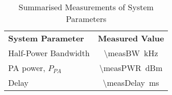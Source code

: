 \begin{table}[htbp]
  \centering
  \caption{Summarised Measurements of System Parameters}
    \begin{tabular}{lc}
    \rowcolor[rgb]{ 0,  0,  0} \textcolor[rgb]{ 1,  1,  1}{\textbf{System Parameter}}	& \textcolor[rgb]{ 1,  1,  1}{\textbf{Measured Value}} 		\\
    	Half-Power Bandwidth										& \SI{\measBW}{kHz}					\\
    	PA power, $P_{PA}$ 											& \SI{\measPWR}{dBm}					\\
    	Delay 													& \SI{\measDelay}{ms} 					\\
 \end{tabular}
  \label{tab:meas_specs}
\end{table}